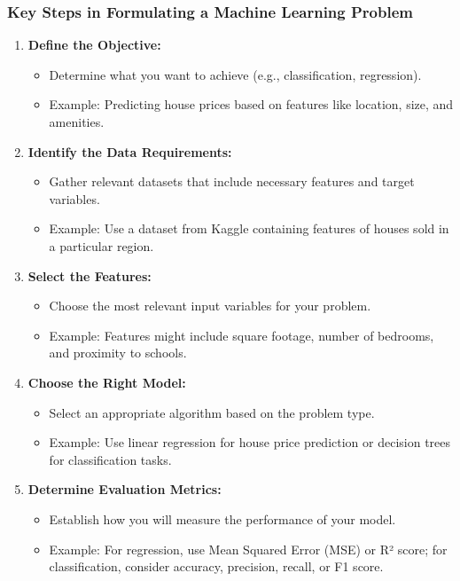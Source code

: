 \documentclass{beamer}
\begin{document}
\begin{frame}[fragile]
    \frametitle{Key Steps in Formulating a Machine Learning Problem}
    \begin{enumerate}
        \item \textbf{Define the Objective:}
        \begin{itemize}
            \item Determine what you want to achieve (e.g., classification, regression).
            \item Example: Predicting house prices based on features like location, size, and amenities.
        \end{itemize}
        
        \item \textbf{Identify the Data Requirements:}
        \begin{itemize}
            \item Gather relevant datasets that include necessary features and target variables.
            \item Example: Use a dataset from Kaggle containing features of houses sold in a particular region.
        \end{itemize}

        \item \textbf{Select the Features:}
        \begin{itemize}
            \item Choose the most relevant input variables for your problem.
            \item Example: Features might include square footage, number of bedrooms, and proximity to schools.
        \end{itemize}
        
        \item \textbf{Choose the Right Model:}
        \begin{itemize}
            \item Select an appropriate algorithm based on the problem type.
            \item Example: Use linear regression for house price prediction or decision trees for classification tasks.
        \end{itemize}
        
        \item \textbf{Determine Evaluation Metrics:}
        \begin{itemize}
            \item Establish how you will measure the performance of your model.
            \item Example: For regression, use Mean Squared Error (MSE) or R² score; for classification, consider accuracy, precision, recall, or F1 score.
        \end{itemize}
    \end{enumerate}
\end{frame}
\end{document}
